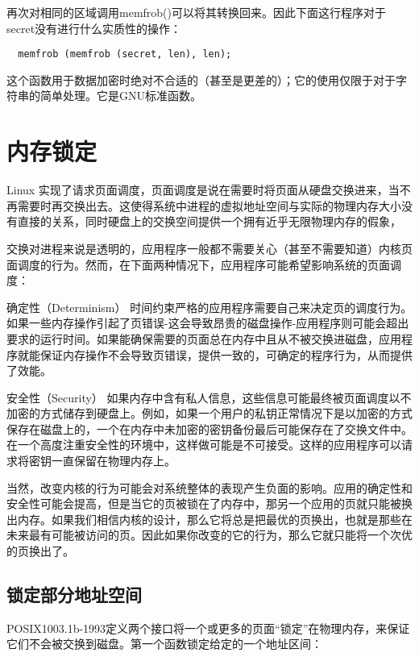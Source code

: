 再次对相同的区域调用memfrob()可以将其转换回来。因此下面这行程序对于secret没有进行什么实质性的操作： 

\begin{lstlisting}
  memfrob (memfrob (secret, len), len);
\end{lstlisting}

这个函数用于数据加密时绝对不合适的（甚至是更差的）；它的使用仅限于对于字符串的简单处理。它是GNU标准函数。 

\section{内存锁定}

Linux 实现了请求页面调度，页面调度是说在需要时将页面从硬盘交换进来，当不再需要时再交换出去。这使得系统中进程的虚拟地址空间与实际的物理内存大小没有直接的关系，同时硬盘上的交换空间提供一个拥有近乎无限物理内存的假象，

交换对进程来说是透明的，应用程序一般都不需要关心（甚至不需要知道）内核页面调度的行为。然而，在下面两种情况下，应用程序可能希望影响系统的页面调度： 

\begin{eqlist*}
\item[确定性（Determinism）] 时间约束严格的应用程序需要自己来决定页的调度行为。如果一些内存操作引起了页错误-这会导致昂贵的磁盘操作-应用程序则可能会超出要求的运行时间。如果能确保需要的页面总在内存中且从不被交换进磁盘，应用程序就能保证内存操作不会导致页错误，提供一致的，可确定的程序行为，从而提供了效能。 
\item[安全性（Security）]如果内存中含有私人信息，这些信息可能最终被页面调度以不加密的方式储存到硬盘上。例如，如果一个用户的私钥正常情况下是以加密的方式保存在磁盘上的，一个在内存中未加密的密钥备份最后可能保存在了交换文件中。在一个高度注重安全性的环境中，这样做可能是不可接受。这样的应用程序可以请求将密钥一直保留在物理内存上。
\end{eqlist*}

当然，改变内核的行为可能会对系统整体的表现产生负面的影响。应用的确定性和安全性可能会提高，但是当它的页被锁在了内存中，那另一个应用的页就只能被换出内存。如果我们相信内核的设计，那么它将总是把最优的页换出，也就是那些在未来最有可能被访问的页。因此如果你改变的它的行为，那么它就只能将一个次优的页换出了。

\subsection{锁定部分地址空间}

POSIX1003.1b-1993定义两个接口将一个或更多的页面“锁定”在物理内存，来保证它们不会被交换到磁盘。第一个函数锁定给定的一个地址区间： 

